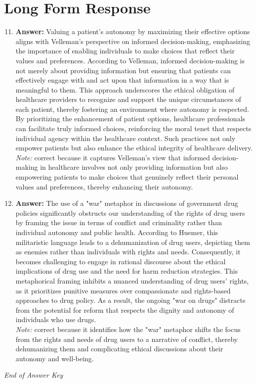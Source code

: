 \documentclass[12pt]{article}
\begin{document}
\section*{Long Form Response}
\begin{enumerate}[label=\arabic*.]
\setcounter{enumi}{10}
\item \textbf{Answer:} Valuing a patient's autonomy by maximizing their effective options aligns with Velleman's perspective on informed decision-making, emphasizing the importance of enabling individuals to make choices that reflect their values and preferences. According to Velleman, informed decision-making is not merely about providing information but ensuring that patients can effectively engage with and act upon that information in a way that is meaningful to them. This approach underscores the ethical obligation of healthcare providers to recognize and support the unique circumstances of each patient, thereby fostering an environment where autonomy is respected. By prioritizing the enhancement of patient options, healthcare professionals can facilitate truly informed choices, reinforcing the moral tenet that respects individual agency within the healthcare context. Such practices not only empower patients but also enhance the ethical integrity of healthcare delivery.
\\ \textit{Note:} correct because it captures Velleman's view that informed decision-making in healthcare involves not only providing information but also empowering patients to make choices that genuinely reflect their personal values and preferences, thereby enhancing their autonomy.
\item \textbf{Answer:} The use of a "war" metaphor in discussions of government drug policies significantly obstructs our understanding of the rights of drug users by framing the issue in terms of conflict and criminality rather than individual autonomy and public health. According to Huemer, this militaristic language leads to a dehumanization of drug users, depicting them as enemies rather than individuals with rights and needs. Consequently, it becomes challenging to engage in rational discourse about the ethical implications of drug use and the need for harm reduction strategies. This metaphorical framing inhibits a nuanced understanding of drug users' rights, as it prioritizes punitive measures over compassionate and rights-based approaches to drug policy. As a result, the ongoing "war on drugs" distracts from the potential for reform that respects the dignity and autonomy of individuals who use drugs.
\\ \textit{Note:} correct because it identifies how the "war" metaphor shifts the focus from the rights and needs of drug users to a narrative of conflict, thereby dehumanizing them and complicating ethical discussions about their autonomy and well-being.
\end{enumerate}

\vfill
\noindent\textit{End of Answer Key}
\end{document}
